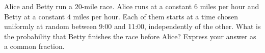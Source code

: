 Alice and Betty run a $20$-mile race. Alice runs at a constant $6$ miles per hour and Betty at a constant $4$ miles per hour. Each of them starts at a time chosen uniformly at random between 9:00 and 11:00, independently of the other. What is the probability that Betty finishes the race before Alice? Express your answer as a common fraction.
